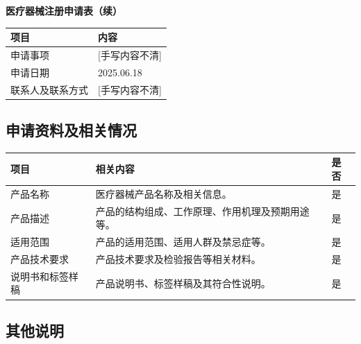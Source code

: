 \documentclass[UTF8,10pt,a4paper,fontset=fandol]{ctexart}
\newcommand{\fieldvalue}[1]{#1}
\newcommand{\handwritten}[1]{#1}
\begin{document}
\noindent
\textbf{医疗器械注册申请表（续）}

\begin{tabularx}{\textwidth}{|p{}|X|}
\hline
项目 & 内容 \\
\hline
申请事项 &
\fieldvalue{\handwritten{[手写内容不清]}} \\
\hline
申请日期 &
\fieldvalue{\handwritten{2025.06.18}} \\
\hline
联系人及联系方式 &
\fieldvalue{\handwritten{[手写内容不清]}} \\
\hline
\end{tabularx}

\subsection*{申请资料及相关情况}

\begin{tabularx}{\textwidth}{|p{}|X|p{}|}
\hline
项目 & 相关内容 & 是否 \\
\hline
产品名称 &
医疗器械产品名称及相关信息。 &
\fieldvalue{\handwritten{是}} \\
\hline
产品描述 &
产品的结构组成、工作原理、作用机理及预期用途等。 &
\fieldvalue{\handwritten{是}} \\
\hline
适用范围 &
产品的适用范围、适用人群及禁忌症等。 &
\fieldvalue{\handwritten{是}} \\
\hline
产品技术要求 &
产品技术要求及检验报告等相关材料。 &
\fieldvalue{\handwritten{是}} \\
\hline
说明书和标签样稿 &
产品说明书、标签样稿及其符合性说明。 &
\fieldvalue{\handwritten{是}} \\
\hline
\end{tabularx}

\subsection*{其他说明}
\end{document}
